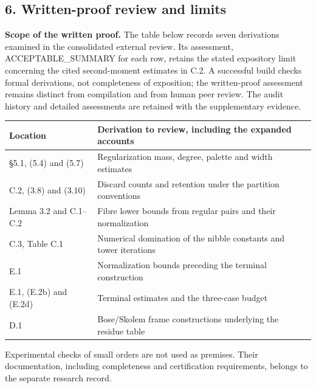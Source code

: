 \documentclass[english,11pt,a4paper]{article}
\newcounter{none}
\begin{document}
\subsection{6. Written-proof review and
limits}\label{written-proof-review-and-limits}

\textbf{Scope of the written proof.} The table below records seven
derivations examined in the consolidated external review. Its
assessment, ACCEPTABLE\_SUMMARY for each row, retains the stated
expository limit concerning the cited second-moment estimates in C.2. A
successful build checks formal derivations, not completeness of
exposition; the written-proof assessment remains distinct from
compilation and from human peer review. The audit history and detailed
assessments are retained with the supplementary evidence.

{\def\LTcaptype{none} %
\begin{longtable}[]{@{}
  >{\raggedright\arraybackslash}p{}
  >{\raggedright\arraybackslash}p{}@{}}
\toprule\noalign{}
\begin{minipage}[b]{\linewidth}\raggedright
Location
\end{minipage} & \begin{minipage}[b]{\linewidth}\raggedright
Derivation to review, including the expanded accounts
\end{minipage} \\
\midrule\noalign{}
\endhead
\bottomrule\noalign{}
\endlastfoot
§5.1, (5.4) and (5.7) & Regularization mass, degree, palette and width
estimates \\
C.2, (3.8) and (3.10) & Discard counts and retention under the partition
conventions \\
Lemma 3.2 and C.1--C.2 & Fibre lower bounds from regular pairs and their
normalization \\
C.3, Table C.1 & Numerical domination of the nibble constants and tower
iterations \\
E.1 & Normalization bounds preceding the terminal construction \\
E.1, (E.2b) and (E.2d) & Terminal estimates and the three-case budget \\
D.1 & Bose/Skolem frame constructions underlying the residue table \\
\end{longtable}
}

Experimental checks of small orders are not used as premises. Their
documentation, including completeness and certification requirements,
belongs to the separate research record.
\end{document}
